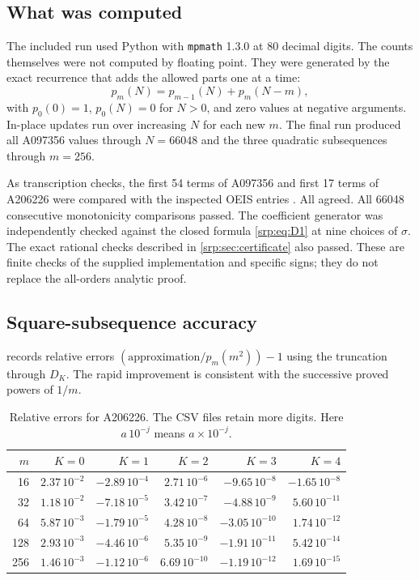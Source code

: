 \documentclass[11pt,a4paper]{article}
\numberwithin{equation}{section}
\theoremstyle{definition}
\theoremstyle{remark}
\begin{document}
\subsection{What was computed}
The included run used Python with \texttt{mpmath} 1.3.0 at 80 decimal
digits. The counts themselves were not computed by floating point.
They were generated by the exact recurrence that adds the allowed parts
one at a time:
\begin{equation}
 p_m(N)=p_{m-1}(N)+p_m(N-m),
 \label{srp:eq:DP}
\end{equation}
with $p_0(0)=1$, $p_0(N)=0$ for $N>0$, and zero values at negative
arguments. In-place updates run over increasing $N$ for each new $m$.
The final run produced all A097356 values through $N=66048$ and the
three quadratic subsequences through $m=256$.

As transcription checks, the first 54 terms of A097356 and first 17
terms of A206226 were compared with the inspected OEIS entries
\cite{oeisA,oeisSquare}. All agreed. All 66048 consecutive monotonicity
comparisons passed. The coefficient generator was independently checked
against the closed formula \eqref{srp:eq:D1} at nine choices of $\sigma$.
The exact rational checks described in \cref{srp:sec:certificate} also
passed. These are finite checks of the supplied implementation and
specific signs; they do not replace the all-orders analytic proof.

\subsection{Square-subsequence accuracy}
 records relative errors
$(\text{approximation}/p_m(m^2))-1$ using the truncation through $D_K$.
The rapid improvement is consistent with the successive proved powers
of $1/m$.
\begin{table}[htbp]
\centering\small
\begin{tabular}{r r r r r r}
\toprule
$m$ & $K=0$ & $K=1$ & $K=2$ & $K=3$ & $K=4$\\
\midrule
16  & $2.37\,10^{-2}$ & $-2.89\,10^{-4}$ & $2.71\,10^{-6}$ & $-9.65\,10^{-8}$ & $-1.65\,10^{-8}$\\
32  & $1.18\,10^{-2}$ & $-7.18\,10^{-5}$ & $3.42\,10^{-7}$ & $-4.88\,10^{-9}$ & $5.60\,10^{-11}$\\
64  & $5.87\,10^{-3}$ & $-1.79\,10^{-5}$ & $4.28\,10^{-8}$ & $-3.05\,10^{-10}$ & $1.74\,10^{-12}$\\
128 & $2.93\,10^{-3}$ & $-4.46\,10^{-6}$ & $5.35\,10^{-9}$ & $-1.91\,10^{-11}$ & $5.42\,10^{-14}$\\
256 & $1.46\,10^{-3}$ & $-1.12\,10^{-6}$ & $6.69\,10^{-10}$ & $-1.19\,10^{-12}$ & $1.69\,10^{-15}$\\
\bottomrule
\end{tabular}
\caption{Relative errors for A206226. The CSV files retain more digits.
Here $a\,10^{-j}$ means $a\times10^{-j}$.}
\label{srp:tab:errors}
\end{table}
\end{document}
